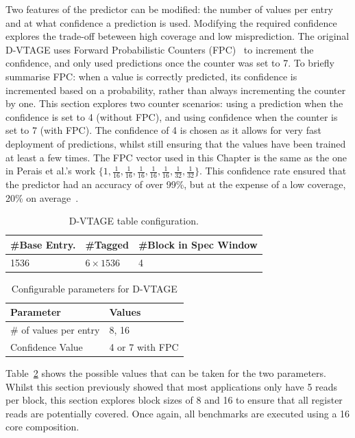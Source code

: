 Two features of the predictor can be modified: the number of values per entry and at what confidence a prediction is used.
Modifying the required confidence explores the trade-off beteween high coverage and low misprediction.
The original D-VTAGE uses Forward Probabilistic Counters (FPC)~\cite{riley2006fpc} to increment the confidence, and only used predictions once the counter was set to 7.
To briefly summarise FPC: when a value is correctly predicted, its confidence is incremented based on a probability, rather than always incrementing the counter by one.
This section explores two counter scenarios: using a prediction when the confidence is set to 4 (without FPC), and using confidence when the counter is set to 7 (with FPC).
The confidence of 4 is chosen as it allows for very fast deployment of predictions, whilst still ensuring that the values have been trained at least a few times.
The FPC vector used in this Chapter is the same as the one in Perais et al.'s work $\{1,\frac{1}{16},\frac{1}{16},\frac{1}{16},\frac{1}{16},\frac{1}{16},\frac{1}{32},\frac{1}{32}\}$.
This confidence rate ensured that the predictor had an accuracy of over 99\%, but at the expense of a low coverage, 20\% on average~\cite{peraisBeBop2015}.


\begin{table}[t]
  \small
  \centering
 \begin{tabular} {| l | l | l |}
 \hline
	\#Base Entry. & \#Tagged & \#Block in Spec Window\\ \hline
	1536 & $6\times1536$ & 4 \\ \hline
	\end{tabular}
  \caption{D-VTAGE table configuration.}\label{tab:vtage-conf}
\end{table}

\begin{table}[t]
\small
\centering
\begin{tabular}{p{5.2cm} p{1.8cm}}
\toprule
\textbf{Parameter} & \textbf{Values} \\ \midrule
\# of values per entry & 8, 16\\
Confidence Value & 4 or 7 with FPC \\ \bottomrule
\end{tabular}
\caption{Configurable parameters for D-VTAGE}\label{tab:vtage-params}
\vspace{1em}
\end{table}

Table~\ref{tab:vtage-params} shows the possible values that can be taken for the two parameters.
Whilst this section previously showed that most applications only have 5 reads per block, this section explores block sizes of 8 and 16 to ensure that all register reads are potentially covered. 
Once again, all benchmarks are executed using a 16 core composition.

